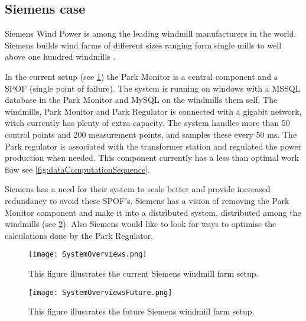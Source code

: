\subsection{Siemens case}
Siemens Wind Power is among the leading windmill manufacturers in the world. 
Siemens builds wind farms of different sizes ranging form single mills to well above one hundred windmills \cite{simensOffShoreProjects, simensOnShoreProjects}.

In the current setup (see \cref{fig:currentSiemensSetup}) the Park Monitor is a central component and a SPOF (single point of failure).
The system is running on windows with a MSSQL database in the Park Monitor and MySQL on the windmills them self.
The windmills, Park Monitor and Park Regulator is connected with a gigabit network, witch currently has plenty of extra capacity.
The system handles more than 50 control points and 200 measurement points, and samples these every 50 ms.
The Park regulator is associated with the transformer station and regulated the power production when needed.
This component currently has a less than optimal work flow see \cref{fig:dataComputationSequence}.

Siemens has a need for their system to scale better and provide increased redundancy to avoid these SPOF's.
Siemens has a vision of removing the Park Monitor component and make it into a distributed system, distributed among the windmills (see \cref{fig:futureSiemensSetup}).
Also Siemens would like to look for ways to optimise the calculations done by the Park Regulator, 

\begin{figure}
	\centering
	\texttt{[image: SystemOverviews.png]} 
	\caption[Illustrates the current Siemens windmill farm setup]{
		\label{fig:currentSiemensSetup} 
		\footnotesize{%
			This figure illustrates the current Siemens windmill farm setup.
		}
	}
\end{figure}

\begin{figure}
	\centering
	\texttt{[image: SystemOverviewsFuture.png]} 
	\caption[Illustrates the future Siemens windmill farm setup]{
		\label{fig:futureSiemensSetup} 
		\footnotesize{%
			This figure illustrates the future Siemens windmill farm setup.
		}
	}
\end{figure}

